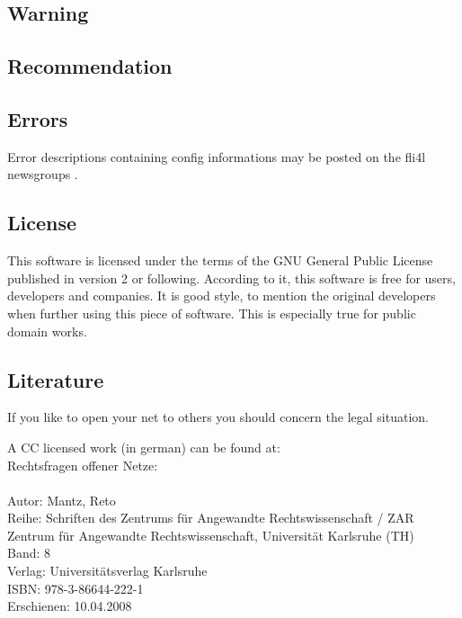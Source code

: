\subsection{Warning}

\subsection{Recommendation}

\subsection{Errors}
Error descriptions containing config informations may be posted on the fli4l newsgroups
.

\subsection{License}
This software is licensed under the terms of the GNU General Public License
published in version 2 or following. According to it, this software is free
for users, developers and companies. It is good style, to mention the
original developers when further using this piece of software.
This is especially true for public domain works.

\subsection{Literature}
If you like to open your net to others you should concern the legal situation.

A CC licensed work (in german) can be found at:\\
Rechtsfragen offener Netze:\\
\\
Autor: Mantz, Reto\\
Reihe: Schriften des Zentrums für Angewandte Rechtswissenschaft / ZAR\\
Zentrum für Angewandte Rechtswissenschaft, Universität Karlsruhe (TH)\\
Band: 8\\
Verlag: Universitätsverlag Karlsruhe\\
ISBN: 978-3-86644-222-1\\
Erschienen: 10.04.2008
